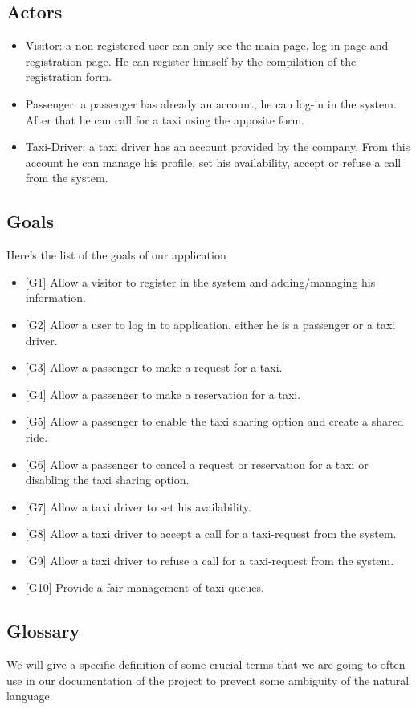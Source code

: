 \subsection{Actors}
	\begin{itemize}
		\item Visitor: a non registered user can only see the main page, log-in page and registration page. He can register himself by the compilation of the registration form.
		\item Passenger: a passenger has already an account, he can log-in in the system. After that he can call for a taxi using the apposite form.
		\item Taxi-Driver: a taxi driver has an account provided by the company. From this account he can manage his profile, set his availability, accept or refuse a call from the system. 
	\end{itemize}

\subsection{Goals}
	Here's the list of the goals of our application
	\begin{itemize}
		\item {[G1]} Allow a visitor to register in the system and adding/managing his information.
		\item {[G2]} Allow a user to log in to application, either he is a passenger or a taxi driver.
		\item {[G3]} Allow a passenger to make a request for a taxi.
		\item {[G4]} Allow a passenger to make a reservation for a taxi.
		\item {[G5]} Allow a passenger to enable the taxi sharing option and create a shared ride.
		\item {[G6]} Allow a passenger to cancel a request or reservation for a taxi or disabling the taxi sharing option.
		\item {[G7]} Allow a taxi driver to set his availability.
		\item {[G8]} Allow a taxi driver to accept a call for a taxi-request from the system.
		\item {[G9]} Allow a taxi driver to refuse a call for a taxi-request from the system.
		\item {[G10]} Provide a fair management of taxi queues.
	\end{itemize}

\subsection{Glossary}
We will give a specific definition of some crucial terms that we are going to often use in our documentation of the project to prevent some ambiguity of the natural language.

